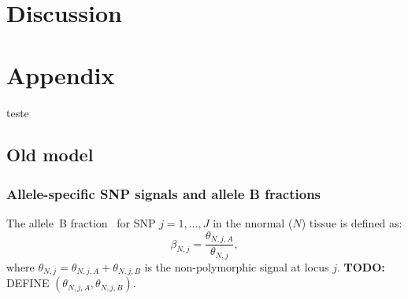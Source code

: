 \documentclass[]{bioinfo}
\newenvironment{TODO}{\color{red}\textbf{TODO:}}{}
\begin{document}
\begin{figure}[!tpbh]
\begin{center}
\end{center}
 \caption{
 }
 \label{figROCs,chr18}
\end{figure}



\section{Discussion}
\label{secDiscussion}

\section{Appendix}
teste
\subsection{Old model}
\label{sec:old-model}

\subsubsection{Allele-specific SNP signals and allele B fractions}
The allele~B fraction~\cite{PeifferD_etal_2006} for SNP $j=1,\ldots,J$ in the nnormal ($N$) tissue is defined as:
\begin{equation}
  \beta_{N,j} = \frac{\theta_{N,j,A}}{\theta_{N,j}},
  \label{eqnCnLogRatio}
\end{equation}
where $\theta_{N,j} = \theta_{N,j,A} + \theta_{N,j,B}$ is the non-polymorphic signal at locus $j$.
\begin{TODO}
  DEFINE $(\theta_{N,j,A}, \theta_{N,j,B})$.
\end{TODO}
\end{document}
